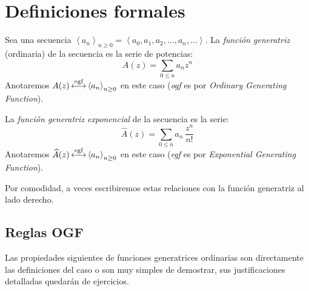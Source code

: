\section{Definiciones formales}
\label{sec:gf-definiciones-formales}

  Sea una secuencia
  \(\left\langle a_n \right\rangle_{n \ge 0}
     = \left\langle
         a_0, a_1, a_2, \dotsc, a_n, \dotsc
       \right\rangle\).
  La \emph{función generatriz} (ordinaria) de la secuencia es
  la serie de potencias:%
  \begin{equation*}
    A(z)=\sum_{0 \le n} a_n z^n
  \end{equation*}
  Anotaremos
  \(A(z)
     \operatorname{\stackrel{\text{ogf}}{\longleftrightarrow}} \left\langle a_n\right\rangle_{n \ge 0}\) en este caso
  (\emph{ogf} es por
     \emph{\foreignlanguage{english}
                           {Ordinary Generating Function}}).

  La \emph{función generatriz exponencial}%
  de la secuencia es la serie:
  \begin{equation*}
    \widehat{A}(z)
      = \sum_{0 \le n} a_n \, \frac{z^n}{n!}
  \end{equation*}
  Anotaremos
  \(\widehat{A}(z)
     \operatorname{\stackrel{\text{egf}}{\longleftrightarrow}} \left\langle a_n\right\rangle_{n \ge 0}\) en este caso
  (\emph{egf} es por
     \emph{\foreignlanguage{english}
                           {Exponential Generating Function}}).

  Por comodidad,
  a veces escribiremos estas relaciones
  con la función generatriz al lado derecho.

\subsection{Reglas OGF}
\label{sec:reglas-OGF}

  Las propiedades siguientes de funciones generatrices ordinarias
  son directamente las definiciones del caso
  o son muy simples de demostrar,
  sus justificaciones detalladas quedarán de ejercicios.

